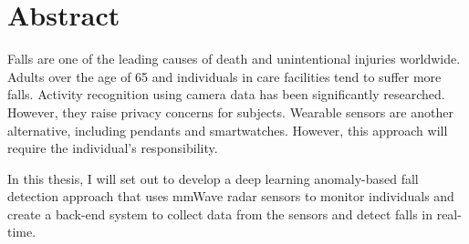 \chapter*{Abstract}\label{abstract}
Falls are one of the leading causes of death and unintentional injuries worldwide. Adults over the age of 65 and individuals in care facilities tend to suffer more falls. Activity recognition using camera data has been significantly researched. However, they raise privacy concerns for subjects. Wearable sensors are another alternative, including pendants and smartwatches. However, this approach will require the individual's responsibility. 

In this thesis, I will set out to develop a deep learning anomaly-based fall detection approach that uses mmWave radar sensors to monitor individuals and create a back-end system to collect data from the sensors and detect falls in real-time. 